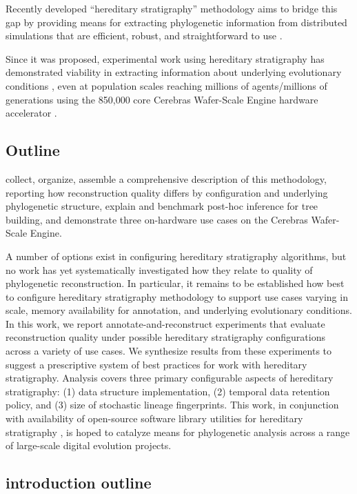 Recently developed ``hereditary stratigraphy'' methodology aims to bridge this gap by providing means for extracting phylogenetic information from distributed simulations that are efficient, robust, and straightforward to use \citep{moreno2022hereditary}.
%

Since it was proposed, experimental work using hereditary stratigraphy has demonstrated viability in extracting information about underlying evolutionary conditions \citep{moreno2024ecology}, even at population scales reaching millions of agents/millions of generations using the 850,000 core Cerebras Wafer-Scale Engine hardware accelerator \citep{moreno2024trackable}.

\subsection{Outline}

collect, organize, assemble a comprehensive description of this methodology, reporting how reconstruction quality differs by configuration and underlying phylogenetic structure, explain and benchmark post-hoc inference for tree building, and demonstrate three on-hardware use cases on the Cerebras Wafer-Scale Engine.

A number of options exist in configuring hereditary stratigraphy algorithms, but no work has yet systematically investigated how they relate to quality of phylogenetic reconstruction.
In particular, it remains to be established how best to configure hereditary stratigraphy methodology to support use cases varying in scale, memory availability for annotation, and underlying evolutionary conditions.
In this work, we report annotate-and-reconstruct experiments that evaluate reconstruction quality under possible hereditary stratigraphy configurations across a variety of use cases.
We synthesize results from these experiments to suggest a prescriptive system of best practices for work with hereditary stratigraphy.
Analysis covers three primary configurable aspects of hereditary stratigraphy: (1) data structure implementation, (2) temporal data retention policy, and (3) size of stochastic lineage fingerprints.
This work, in conjunction with availability of open-source software library utilities for hereditary stratigraphy \citep{moreno2022hstrat}, is hoped to catalyze means for phylogenetic analysis across a range of large-scale digital evolution projects.


\subsection{introduction outline}

